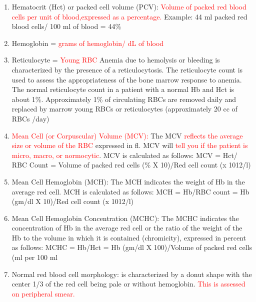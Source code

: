 \begin{enumerate}[1.]\tightlist
\item Hematocrit (Hct) or packed cell volume (PCV):\newline
\textcolor{red}{Volume of packed red blood cells per unit of blood,expressed as a percentage.}\newline
Example: 44 ml packed red blood cells/ 100 ml of blood = 44\%
\item Hemoglobin = \textcolor{red}{grams of hemoglobin/ dL of blood}
\item Reticulocyte = \textcolor{red}{Young RBC}
Anemia due to hemolysis or bleeding is characterized by
the presence of a reticulocytosis. The reticulocyte count
is used to assess the appropriateness of the bone
marrow response to anemia. The normal reticulocyte
count in a patient with a normal Hb and Hct is about 1\%.
Approximately 1\% of circulating RBCs are removed daily
and replaced by marrow young RBCs or reticulocytes
(approximately 20 cc of RBCs /day)
\item \textcolor{red}{Mean Cell (or Corpuscular) Volume (MCV):}
The MCV \textcolor{red}{reflects the average size or volume of the RBC} 
expressed in fl. MCV will \textcolor{red}{tell you if the patient is micro, macro, or normocytic}. MCV is calculated as follows:\newline
MCV = Hct/ RBC Count = Volume of packed red cells (\% X 10)/Red cell count (x 1012/l)
\item Mean Cell Hemoglobin (MCH):
The MCH indicates the weight of Hb in the average red cell.
MCH is calculated as follows:\newline
MCH = Hb/RBC count 
= Hb (gm/dl X 10)/Red cell count (x 1012/l)
\item Mean Cell Hemoglobin Concentration (MCHC):
The MCHC indicates the concentration of Hb in the average
red cell or the ratio of the weight of the Hb to the volume in
which it is contained (chromicity), expressed in percent as
follows:\newline
MCHC = Hb/Hct 
= Hb (gm/dl X 100)/Volume of packed red cells (ml per 100 ml
\item Normal red blood cell morphology: is characterized
by a donut shape with the center 1/3 of the red cell being pale or
without hemoglobin. \textcolor{red}{This is assessed on peripheral smear. }
\end{enumerate}

